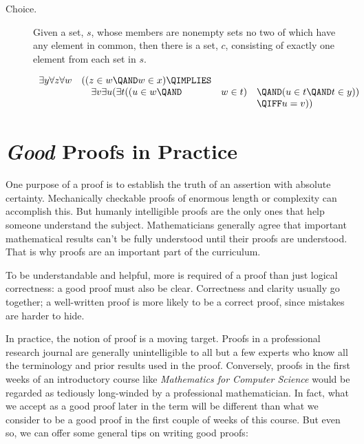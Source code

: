 {\begin{description}
\item[Choice.]  Given a set, $s$, whose members are nonempty sets no two
  of which have any element in common, then there is a set, $c$,
  consisting of exactly one element from each set in $s$.


\[\begin{array}{rlll}
\exists y \forall z \forall w & ( (z \in w \QAND w \in x) \QIMPLIES\\
                              &\quad \exists v \exists u (\exists t
                                           ((u \in w \QAND & w \in t)
                                                              & \QAND (u \in t \QAND t \in y))\\
                                                            &&& \QIFF u = v))
\end{array}\]

\end{description}
}
\newpage

\section{\textit{Good} Proofs in Practice}

One purpose of a proof is to establish the truth of an assertion with
absolute certainty.  Mechanically checkable proofs of enormous length or
complexity can accomplish this.  But humanly intelligible proofs are the
only ones that help someone understand the subject.  Mathematicians
generally agree that important mathematical results can't be fully
understood until their proofs are understood.  That is why proofs are an
important part of the curriculum.

To be understandable and helpful, more is required of a proof than just
logical correctness: a good proof must also be clear.  Correctness and
clarity usually go together; a well-written proof is more likely to be a
correct proof, since mistakes are harder to hide.

In practice, the notion of proof is a moving target.  Proofs in a
professional research journal are generally unintelligible to all but
a few experts who know all the terminology and prior results used in
the proof.  Conversely, proofs in the first weeks of an introductory
course like \emph{Mathematics
for Computer Science} would be regarded as tediously
long-winded by a professional mathematician.  In fact, what we accept
as a good proof later in the term will be different than what we
consider to be a good proof in the first couple of weeks of this
course. But even so, we can offer some
general tips on writing good proofs:

